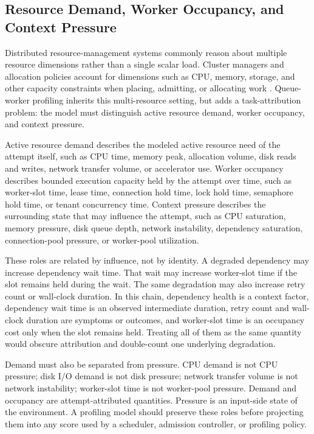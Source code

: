 \subsection{Resource Demand, Worker Occupancy, and Context Pressure}
\label{sec:background-demand-occupancy-pressure}

Distributed resource-management systems commonly reason about multiple resource
dimensions rather than a single scalar load. Cluster managers and allocation
policies account for dimensions such as CPU, memory, storage, and other capacity
constraints when placing, admitting, or allocating work
\cite{verma2015borg,ghodsi2011drf}. Queue-worker profiling inherits this
multi-resource setting, but adds a task-attribution problem: the model must
distinguish active resource demand, worker occupancy, and context pressure.

Active resource demand describes the modeled active resource need of the attempt
itself, such as CPU time, memory peak, allocation volume, disk reads and writes,
network transfer volume, or accelerator use. Worker occupancy describes bounded
execution capacity held by the attempt over time, such as worker-slot time,
lease time, connection hold time, lock hold time, semaphore hold time, or tenant
concurrency time. Context pressure describes the surrounding state that may
influence the attempt, such as CPU saturation, memory pressure, disk queue depth,
network instability, dependency saturation, connection-pool pressure, or
worker-pool utilization.

These roles are related by influence, not by identity. A degraded dependency may
increase dependency wait time. That wait may increase worker-slot time if the
slot remains held during the wait. The same degradation may also increase retry
count or wall-clock duration. In this chain, dependency health is a context
factor, dependency wait time is an observed intermediate duration, retry count
and wall-clock duration are symptoms or outcomes, and worker-slot time is an
occupancy cost only when the slot remains held. Treating all of them as the same
quantity would obscure attribution and double-count one underlying degradation.

Demand must also be separated from pressure. CPU demand is not CPU pressure;
disk I/O demand is not disk pressure; network transfer volume is not network
instability; worker-slot time is not worker-pool pressure. Demand and occupancy
are attempt-attributed quantities. Pressure is an input-side state of the
environment. A profiling model should preserve these roles before projecting
them into any score used by a scheduler, admission controller, or profiling
policy.

